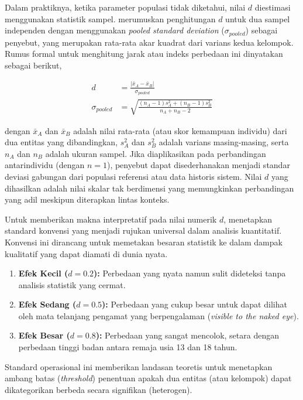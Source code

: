 Dalam praktiknya, ketika parameter populasi tidak diketahui, nilai $d$ diestimasi
\linebreak menggunakan statistik sampel. \textcite{Cohen1988} merumuskan penghitungan $d$
untuk dua sampel independen dengan menggunakan \textit{pooled standard deviation}
($\sigma_{pooled}$) sebagai penyebut, yang merupakan rata-rata akar kuadrat dari
varians kedua kelompok. Rumus formal untuk menghitung jarak atau indeks perbedaan
ini dinyatakan sebagai berikut,

\begin{align}
    d &= \frac{| \bar{x}_A - \bar{x}_B |}{\sigma_{pooled}} \label{eq:cohen_d_basic} \\
    \sigma_{pooled} &= \sqrt{\frac{(n_A-1)s_A^2 + (n_B-1)s_B^2}{n_A + n_B - 2}} \label{eq:sigma_pooled}
\end{align}

dengan $\bar{x}_A$ dan $\bar{x}_B$ adalah nilai rata-rata (atau skor kemampuan
individu) dari dua entitas yang dibandingkan, $s_A^2$ dan $s_B^2$ adalah varians
masing-masing, serta $n_A$ dan $n_B$ adalah ukuran sampel. Jika diaplikasikan pada
perbandingan antarindividu (dengan $n=1$), penyebut dapat disederhanakan menjadi
standar deviasi gabungan dari populasi referensi atau data historis sistem. Nilai
$d$ yang dihasilkan adalah nilai skalar tak berdimensi yang memungkinkan
perbandingan yang adil meskipun diterapkan lintas konteks.

Untuk memberikan makna interpretatif pada nilai numerik $d$, \textcite{Cohen1988} menetapkan standard konvensi yang menjadi rujukan universal dalam analisis kuantitatif. Konvensi ini dirancang untuk memetakan besaran statistik ke dalam dampak kualitatif yang dapat diamati di dunia nyata.
\begin{enumerate}
    \item \textbf{Efek Kecil ($d = 0.2$):} Perbedaan yang nyata namun sulit dideteksi tanpa analisis statistik yang cermat.
    \item \textbf{Efek Sedang ($d = 0.5$):} Perbedaan yang cukup besar untuk dapat dilihat oleh mata telanjang pengamat yang berpengalaman (\textit{visible to the naked eye}).
    \item \textbf{Efek Besar ($d = 0.8$):} Perbedaan yang sangat mencolok, setara dengan perbedaan tinggi badan antara remaja usia 13 dan 18 tahun.
\end{enumerate}

Standard operasional ini memberikan landasan teoretis untuk menetapkan ambang batas (\textit{threshold}) penentuan apakah dua entitas (atau kelompok) dapat dikategorikan berbeda secara signifikan (heterogen).

